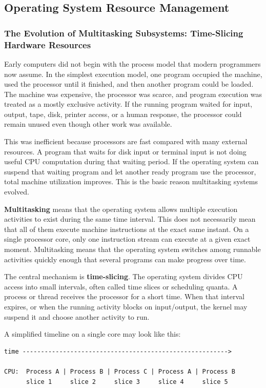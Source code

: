 \subsection{Operating System Resource Management}


\subsubsection{The Evolution of Multitasking Subsystems: Time-Slicing Hardware Resources}

Early computers did not begin with the process model that modern programmers now assume. In the simplest execution model, one program occupied the machine, used the processor until it finished, and then another program could be loaded. The machine was expensive, the processor was scarce, and program execution was treated as a mostly exclusive activity. If the running program waited for input, output, tape, disk, printer access, or a human response, the processor could remain unused even though other work was available.

This was inefficient because processors are fast compared with many external resources. A program that waits for disk input or terminal input is not doing useful CPU computation during that waiting period. If the operating system can suspend that waiting program and let another ready program use the processor, total machine utilization improves. This is the basic reason multitasking systems evolved.

\textbf{Multitasking} means that the operating system allows multiple execution activities to exist during the same time interval. This does not necessarily mean that all of them execute machine instructions at the exact same instant. On a single processor core, only one instruction stream can execute at a given exact moment. Multitasking means that the operating system switches among runnable activities quickly enough that several programs can make progress over time.

The central mechanism is \textbf{time-slicing}. The operating system divides CPU access into small intervals, often called time slices or scheduling quanta. A process or thread receives the processor for a short time. When that interval expires, or when the running activity blocks on input/output, the kernel may suspend it and choose another activity to run.

A simplified timeline on a single core may look like this:

\begin{verbatim}
time -------------------------------------------------------->

CPU:  Process A | Process B | Process C | Process A | Process B
      slice 1     slice 2     slice 3     slice 4     slice 5
\end{verbatim}

